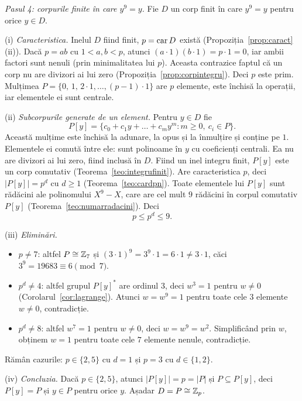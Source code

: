 \begin{solutie}
\smallskip
\textit{Pasul 4: corpurile finite în care $y^{9}=y$.} Fie $D$ un corp finit în care $y^{9}=y$ pentru orice $y\in D$.

(i) \emph{Caracteristica.} Inelul $D$ fiind finit, $p=\operatorname{car} D$ există (Propoziția~\ref{prop:caract}(ii)). Dacă $p=ab$ cu $1<a,b<p$, atunci $(a\cdot 1)(b\cdot 1)=p\cdot 1=0$, iar ambii factori sunt nenuli (prin minimalitatea lui $p$). Aceasta contrazice faptul că un corp nu are divizori ai lui zero (Propoziția~\ref{prop:corpintegru}). Deci $p$ este prim. Mulțimea $P=\{0,\,1,\,2\cdot 1,\dots,(p-1)\cdot 1\}$ are $p$ elemente, este închisă la operații, iar elementele ei sunt centrale.

(ii) \emph{Subcorpurile generate de un element.} Pentru $y\in D$ fie
\[
  P[y]=\{c_0+c_1y+\dots+c_my^{m} : m\ge 0,\ c_i\in P\}.
\]
Această mulțime este închisă la adunare, la opus și la înmulțire și conține pe $1$. Elementele ei comută între ele: sunt polinoame în $y$ cu coeficienți centrali. Ea nu are divizori ai lui zero, fiind inclusă în $D$. Fiind un inel integru finit, $P[y]$ este un corp comutativ (Teorema~\ref{teo:integrufinit}). Are caracteristica $p$, deci $|P[y]|=p^{d}$ cu $d\ge 1$ (Teorema~\ref{teo:cardpn}). Toate elementele lui $P[y]$ sunt rădăcini ale polinomului $X^{9}-X$, care are cel mult $9$ rădăcini în corpul comutativ $P[y]$ (Teorema~\ref{teo:numarradacini}). Deci
\[
  p\le p^{d}\le 9 .
\]

(iii) \emph{Eliminări.}
\begin{itemize}[nosep,leftmargin=1.4em]
  \item $p\neq 7$: altfel $P\cong\mathbb{Z}_7$ și $(3\cdot 1)^{9}=3^{9}\cdot 1=6\cdot 1\neq 3\cdot 1$, căci $3^{9}=19683\equiv 6\pmod 7$.
  \item $p^{d}\neq 4$: altfel grupul $P[y]^{*}$ are ordinul $3$, deci $w^{3}=1$ pentru $w\neq 0$ (Corolarul~\ref{cor:lagrange}). Atunci $w=w^{9}=1$ pentru toate cele $3$ elemente $w\neq 0$, contradicție.
  \item $p^{d}\neq 8$: altfel $w^{7}=1$ pentru $w\neq 0$, deci $w=w^{9}=w^{2}$. Simplificând prin $w$, obținem $w=1$ pentru toate cele $7$ elemente nenule, contradicție.
\end{itemize}
Rămân cazurile: $p\in\{2,5\}$ cu $d=1$ și $p=3$ cu $d\in\{1,2\}$.

(iv) \emph{Concluzia.} Dacă $p\in\{2,5\}$, atunci $|P[y]|=p=|P|$ și $P\subseteq P[y]$, deci $P[y]=P$ și $y\in P$ pentru orice $y$. Așadar $D=P\cong\mathbb{Z}_p$.


\end{solutie}
